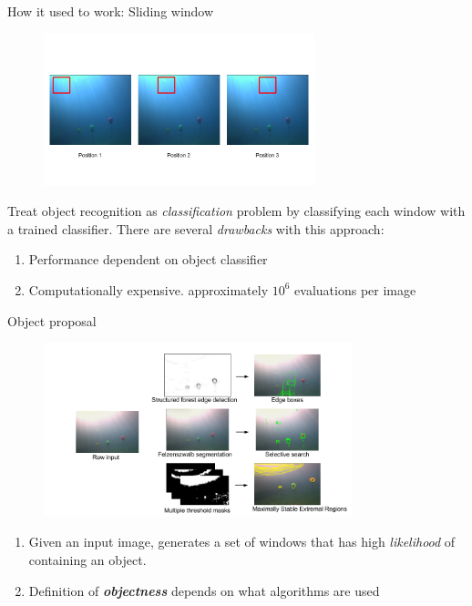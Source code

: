 \documentclass[13pt]{beamer}
\begin{document}
\begin{frame}{How it used to work: Sliding window}

  \begin{figure}[ht]
      \centering
      \includegraphics[width=0.7\textwidth, height=0.4\textwidth]{figs/sliding_window.png}
  \end{figure}

  Treat object recognition as \textit{classification} problem by classifying
  each window with a trained classifier. There are several \textit{drawbacks}
  with this approach:

  \begin{enumerate}
    \item Performance dependent on object classifier
    \item Computationally expensive. approximately $10^6$ evaluations per image
  \end{enumerate}
\end{frame}

\begin{frame}{Object proposal}

  \begin{figure}[ht]
      \centering
      \includegraphics[width=0.8\textwidth, height=0.4\textwidth]{figs/proposals_results.png}
  \end{figure}

  \begin{enumerate}
    \item Given an input image, generates a set of windows that has high
      \textit{likelihood} of containing an object.
    \item Definition of \textbf{\textit{objectness}} depends on what algorithms are used
  \end{enumerate}
\end{frame}
\end{document}
